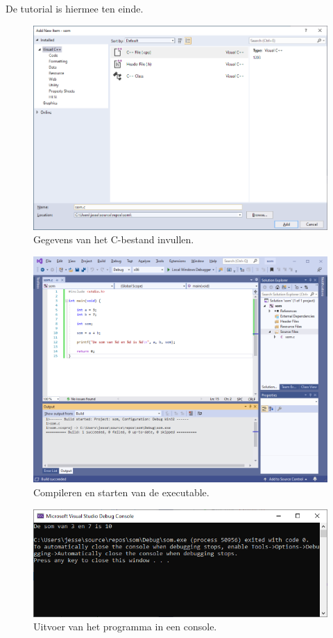 \documentclass[a4paper,10pt,fleqn,twoside]{article}
\begin{document}
De tutorial is hiermee ten einde.

\begin{figure}[H]
\centering
\includegraphics[scale=0.5]{005enterfilename}
\caption{Gegevens van het C-bestand invullen.}
\label{fig:005enterfilename}
\end{figure}

\begin{figure}[H]
\centering
\includegraphics[scale=0.5]{006build}
\caption{Compileren en starten van de executable.}
\label{fig:006build}
\end{figure}

\begin{figure}[H]
\centering
\includegraphics[scale=0.5]{007output}
\caption{Uitvoer van het programma in een console.}
\label{fig:007output}
\end{figure}
\end{document}

